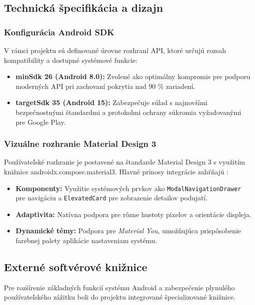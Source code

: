 \subsection{Technická špecifikácia a dizajn}

\subsubsection{Konfigurácia Android SDK}
V rámci projektu sú definované úrovne rozhraní API, ktoré určujú rozsah kompatibility a dostupné systémové funkcie:
\begin{itemize}[noitemsep, topsep=0pt]
    \item \textbf{minSdk 26 (Android 8.0):} Zvolené ako optimálny kompromis pre podporu moderných API pri zachovaní pokrytia nad 90 \% zariadení.
    \item \textbf{targetSdk 35 (Android 15):} Zabezpečuje súlad s najnovšími bezpečnostnými štandardmi a protokolmi ochrany súkromia vyžadovanými pre Google Play.
\end{itemize}

\subsubsection{Vizuálne rozhranie Material Design 3}
Používateľské rozhranie je postavené na štandarde Material Design 3 s využitím knižnice androidx.compose.material3. Hlavné prínosy integrácie zahŕňajú \cite{material3_getstarted, google_material3_compose}:
\begin{itemize}[noitemsep, topsep=0pt]
    \item \textbf{Komponenty:} Využitie systémových prvkov ako \texttt{ModalNavigationDrawer} pre navigáciu a \texttt{ElevatedCard} pre zobrazenie detailov podujatí.
    \item \textbf{Adaptivita:} Natívna podpora pre rôzne hustoty pixelov a orientácie displeja.
    \item \textbf{Dynamické témy:} Podpora pre \textit{Material You}, umožňujúca prispôsobenie farebnej palety aplikácie nastaveniam systému.
\end{itemize}


\subsection{Externé softvérové knižnice}
Pre rozšírenie základných funkcií systému Android a zabezpečenie plynulého používateľského zážitku 
boli do projektu integrované špecializované knižnice.

